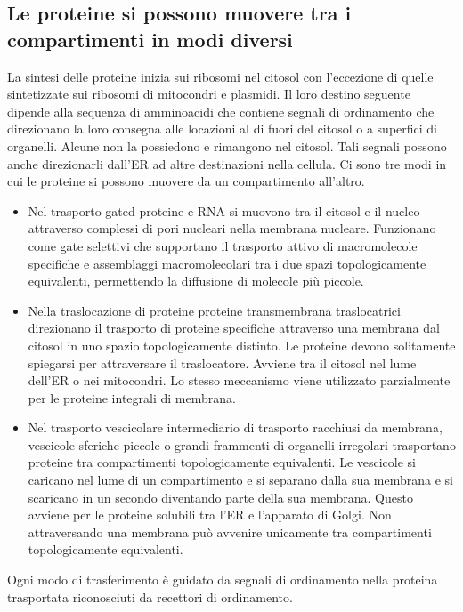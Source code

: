 \subsection{Le proteine si possono muovere tra i compartimenti in modi diversi}
La sintesi delle proteine inizia sui ribosomi nel citosol con l'eccezione di quelle sintetizzate sui ribosomi di mitocondri e plasmidi. Il loro destino seguente dipende alla sequenza
di amminoacidi che contiene segnali di ordinamento che direzionano la loro consegna alle locazioni al di fuori del citosol o a superfici di organelli. Alcune non la possiedono e 
rimangono nel citosol. Tali segnali possono anche direzionarli dall'ER ad altre destinazioni nella cellula. Ci sono tre modi in cui le proteine si possono muovere da un compartimento 
all'altro.
\begin{itemize}
	\item Nel trasporto gated proteine e RNA si muovono tra il citosol e il nucleo attraverso complessi di pori nucleari nella membrana nucleare. Funzionano come 
		gate selettivi che supportano il trasporto attivo di macromolecole specifiche e assemblaggi macromolecolari tra i due spazi topologicamente equivalenti, permettendo la
		diffusione di molecole pi\`u piccole.
	\item Nella traslocazione di proteine proteine transmembrana traslocatrici direzionano il trasporto di proteine specifiche attraverso una membrana dal citosol in uno spazio 
		topologicamente distinto. Le proteine devono solitamente spiegarsi per attraversare il traslocatore. Avviene tra il citosol nel lume dell'ER o nei mitocondri. Lo 
		stesso meccanismo viene utilizzato parzialmente per le proteine integrali di membrana.
	\item Nel trasporto vescicolare intermediario di trasporto racchiusi da membrana, vescicole sferiche piccole o grandi frammenti di organelli irregolari trasportano proteine tra
		compartimenti topologicamente equivalenti. Le vescicole si caricano nel lume di un compartimento e si separano dalla sua membrana e si scaricano in un secondo diventando
		parte della sua membrana. Questo avviene per le proteine solubili tra l'ER e l'apparato di Golgi. Non attraversando una membrana pu\`o avvenire unicamente tra 
		compartimenti topologicamente equivalenti.
\end{itemize}
Ogni modo di trasferimento \`e guidato da segnali di ordinamento nella proteina trasportata riconosciuti da recettori di ordinamento. 
